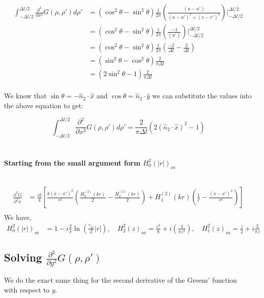 \documentclass{article}
\newcommand{\0}{\varnothing}
\begin{document}
\begin{align*}
    \int_{-\Delta l/2}^{\Delta l/2}\frac{\partial^2}{\partial x^2}G(\rho, \rho')d\rho' &= \left(\cos^2\theta - \sin^2\theta\right)\frac{1}{2\pi}\left(\frac{(u-u')}{(u-u')^2 + (v-v')^2}\right)|_{-\Delta l/2}^{\Delta l/2}\\
    &=\left(\cos^2\theta - \sin^2\theta\right)\frac{1}{2\pi}\left(\frac{-1}{(u')}\right)|_{-\Delta l/2}^{\Delta l/2}\\
    &=\left(\cos^2\theta - \sin^2\theta\right)\frac{1}{2\pi}\left(\frac{-2}{\Delta l} - \frac{2}{\Delta l}\right)\\
    &=\left(\sin^2\theta - \cos^2\theta\right)\frac{2}{\pi\Delta l}\\
    &=\left(2\sin^2\theta - 1\right)\frac{2}{\pi\Delta l}\\
\end{align*}

We know that $\sin\theta = -\hat{n}_2 \cdot \hat{x}$ and $\cos\theta = \hat{n}_2 \cdot \hat{y}$ we can substitute the values into the above equation to get:

\begin{equation}
    \int_{-\Delta l/2}^{\Delta l/2}\frac{\partial^2}{\partial x^2}G(\rho, \rho')d\rho' = \frac{2}{\pi\Delta l}\left(2(\hat{n}_2 \cdot \hat{x})^2 - 1\right)
\end{equation}
\ \\

{\ \\ \centering \bf Starting from the small argument form $H_0^2(|r|)_{sa}$\ \\\ \\}

\begin{align*}
    \frac{\partial^2 G}{\partial^2 x} 
    &= \frac{ik}{4} \left[ \frac{k(x-x')^2}{r^2} \left( \frac{H_{0}^{(2)}(kr)}{2} - \frac{H_{2}^{(2)}(kr)}{2} \right) + 
        H_{1}^{(2)}(kr)\left(\frac{1}{r} - \frac{(x-x')^2}{r^3} \right)  \right] \\
\end{align*}
We have,
\begin{align*}
    H_0^2(|r|)_{sa} &= 1 - i \frac{2}{\pi} \ln \left(\frac{\gamma_G}{2} |r| \right), \quad
    H_2^2(z)_{sa} =  \frac{z^2}{8} + i \left( \frac{4}{\pi z^2} \right), \quad
    H_1^2(z)_{sa} = \frac{z}{2} + i  \frac{2}{\pi z} 
\end{align*}

\subsection{Solving $\frac{\partial^2}{\partial y^2}G(\rho,\rho')$}
We do the exact same thing for the second derivative of the Greens' function with respect to $y$.
\end{document}
